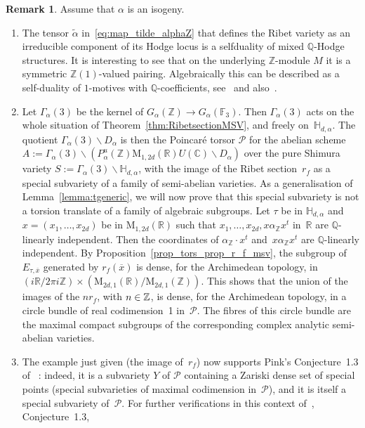 \documentclass[JEP,XML,SOM,Unicode,NoFloatCountersInSection]{cedram}
\let\mathcal\mathscr
\let\cal\mathcal
\theoremstyle{plain}
\theoremstyle{definition}
\newtheorem{Remark}[subsection]{Remark}
\numberwithin{equation}{subsection}
\let\ol\overline
\renewcommand{\C}{\mathbb C}
\newcommand{\R}{\mathbb R}
\newcommand{\Q}{\mathbb Q}
\newcommand{\Z}{\mathbb Z}
\newcommand{\F}{\mathbb F}
\renewcommand{\H}{\mathbb H}
\newcommand{\calP}{\mathcal{P}}
\newcommand{\rmM}{\mathrm{M}}
\begin{document}
\begin{Remark}\label{rem_r_f_msv}
Assume that $\alpha$ is an isogeny.
\begin{enumerate}
\item The tensor $\widetilde{\alpha}$ in~\eqref{eq:map_tilde_alphaZ}
that defines the Ribet variety as an irreducible component of its
Hodge locus is a selfduality of mixed $\Q$-Hodge structures. It is
interesting to see that on the underlying $\Z$-module $M$ it is a
symmetric $\Z(1)$-valued pairing. Algebraically this can be
described as a self-duality of $1$-motives with $\Q$-coefficients,
see~\cite{Ribet} and also~\cite{Bertrand13a}.
\item\label{rem_r_f_msv_item_2} Let $\Gamma_\alpha(3)$ be the kernel
of $G_\alpha(\Z)\to G_\alpha(\F_3)$. Then $\Gamma_\alpha(3)$ acts on
the whole situation of Theorem~\ref{thm:RibetsectionMSV}, and freely
on~$\H_{d,\alpha}$. The quotient $\Gamma_\alpha(3) \backslash
D_\alpha$ is then the Poincaré torsor $\calP$ for the abelian
scheme $A:=\Gamma_\alpha(3)\backslash
(P_\alpha^u(\Z)\rmM_{1,2d}(\R)U(\C)\backslash D_\alpha)$ over the
pure Shimura variety $S:=\Gamma_{\alpha}(3)\backslash
\H_{d,\alpha}$, with the image of the Ribet section~$r_f$ as a
special subvariety of a family of semi-abelian varieties. As a
generalisation of Lemma~\ref{lemma:tgeneric}, we will now prove that
this special subvariety is not a torsion translate of a family of
algebraic subgroups. Let $\tau$ be in $\H_{d,\alpha}$ and
$x=(x_1,\ldots,x_{2d})$ be in $\rmM_{1,2d}(\R)$ such that
$x_1,\ldots,x_{2d}, x\alpha_\Z x^t$ in~$\R$ are $\Q$-linearly
independent. Then the coordinates of $\alpha_\Z{\cdot}x^t$ and~$x\alpha_\Z x^t$ are $\Q$-linearly independent. By
Proposition~\ref{prop_tors_prop_r_f_msv}, the subgroup of
$E_{\tau,\ol{x}}$ generated by $r_f(\ol{x})$ is dense, for the
Archimedean topology, in $(i\R/2\pi
i\Z)\times(\rmM_{2d,1}(\R)/\rmM_{2d,1}(\Z))$. This shows that the
union of the images of the $nr_f$, with $n\in\nobreak\Z$, is dense, for the
Archimedean topology, in a circle bundle of real codimension~1
in~$\cal{P}$. The fibres of this circle bundle are the maximal
compact subgroups of the corresponding complex analytic semi-abelian
varieties.
\item The example just given (the image of~$r_f$) now supports Pink's
Conjecture~1.3 of ~\cite{Pink2}: indeed, it is a subvariety $Y$ of
$\calP$ containing a Zariski dense set of special points
(\ie special subvarieties of maximal codimension in~$\calP$), and
it is itself a special subvariety of~$\calP$. For further
verifications in this context of~\cite{Pink2}, Conjecture~1.3,

\end{enumerate}
\end{Remark}
\end{document}
